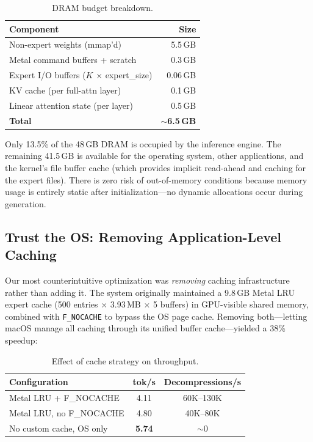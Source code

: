 \documentclass[11pt,twocolumn]{article}
\begin{document}
\begin{table}[t]
\centering
\small
\caption{DRAM budget breakdown.}
\label{tab:memory}
\begin{tabular}{@{}lr@{}}
\toprule
\textbf{Component} & \textbf{Size} \\
\midrule
Non-expert weights (mmap'd) & 5.5\,GB \\
Metal command buffers + scratch & 0.3\,GB \\
Expert I/O buffers ($K$ $\times$ expert\_size) & 0.06\,GB \\
KV cache (per full-attn layer) & 0.1\,GB \\
Linear attention state (per layer) & 0.5\,GB \\
\midrule
\textbf{Total} & \textbf{$\sim$6.5\,GB} \\
\bottomrule
\end{tabular}
\end{table}

Only 13.5\% of the 48\,GB DRAM is occupied by the inference engine.
The remaining 41.5\,GB is available for the operating system, other applications, and the kernel's file buffer cache (which provides implicit read-ahead and caching for the expert files).
There is zero risk of out-of-memory conditions because memory usage is entirely static after initialization---no dynamic allocations occur during generation.

\subsection{Trust the OS: Removing Application-Level Caching}
\label{sec:trust_os}

Our most counterintuitive optimization was \emph{removing} caching infrastructure rather than adding it.
The system originally maintained a 9.8\,GB Metal LRU expert cache (500 entries $\times$ 3.93\,MB $\times$ 5 buffers) in GPU-visible shared memory, combined with \texttt{F\_NOCACHE} to bypass the OS page cache.
Removing both---letting macOS manage all caching through its unified buffer cache---yielded a 38\% speedup:

\begin{table}[t]
\centering
\small
\caption{Effect of cache strategy on throughput.}
\label{tab:trust_os}
\begin{tabular}{@{}lcc@{}}
\toprule
\textbf{Configuration} & \textbf{tok/s} & \textbf{Decompressions/s} \\
\midrule
Metal LRU + F\_NOCACHE & 4.11 & 60K--130K \\
Metal LRU, no F\_NOCACHE & 4.80 & 40K--80K \\
No custom cache, OS only & \textbf{5.74} & $\sim$0 \\
\bottomrule
\end{tabular}
\end{table}
\end{document}
